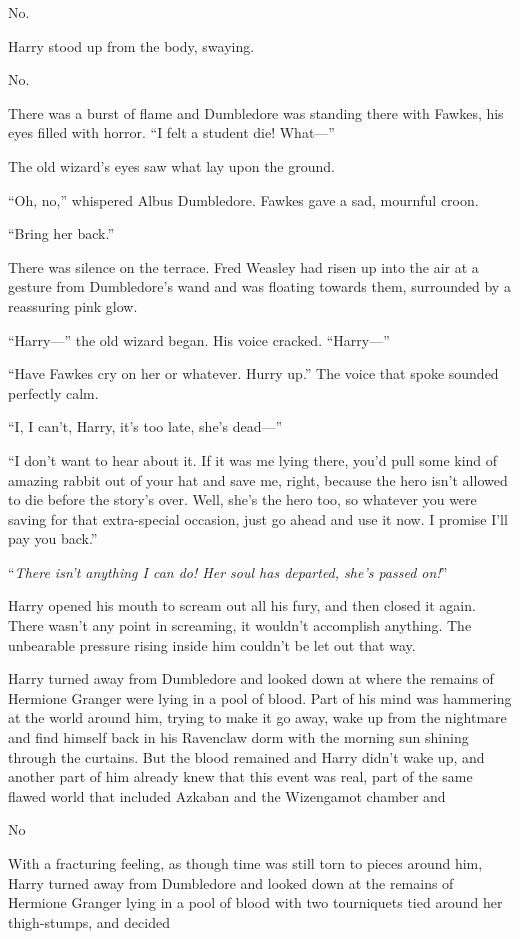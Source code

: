 No.

Harry stood up from the body, swaying.

No.

There was a burst of flame and Dumbledore was standing there with Fawkes, his eyes filled with horror. “I felt a student die! What—”

The old wizard’s eyes saw what lay upon the ground.

“Oh, no,” whispered Albus Dumbledore. Fawkes gave a sad, mournful croon.

“Bring her back.”

There was silence on the terrace. Fred Weasley had risen up into the air at a gesture from Dumbledore’s wand and was floating towards them, surrounded by a reassuring pink glow.

“Harry—” the old wizard began. His voice cracked. “Harry—”

“Have Fawkes cry on her or whatever. Hurry up.” The voice that spoke sounded perfectly calm.

“I, I can’t, Harry, it’s too late, she’s dead—”

“I don’t want to hear about it. If it was me lying there, you’d pull some kind of amazing rabbit out of your hat and save me, right, because the hero isn’t allowed to die before the story’s over. Well, she’s the hero too, so whatever you were saving for that extra-special occasion, just go ahead and use it now. I promise I’ll pay you back.”

“\emph{There isn’t anything I can do! Her soul has departed, she’s passed on!}”

Harry opened his mouth to scream out all his fury, and then closed it again. There wasn’t any point in screaming, it wouldn’t accomplish anything. The unbearable pressure rising inside him couldn’t be let out that way.

Harry turned away from Dumbledore and looked down at where the remains of Hermione Granger were lying in a pool of blood. Part of his mind was hammering at the world around him, trying to make it go away, wake up from the nightmare and find himself back in his Ravenclaw dorm with the morning sun shining through the curtains. But the blood remained and Harry didn’t wake up, and another part of him already knew that this event was real, part of the same flawed world that included Azkaban and the Wizengamot chamber and

No

With a fracturing feeling, as though time was still torn to pieces around him, Harry turned away from Dumbledore and looked down at the remains of Hermione Granger lying in a pool of blood with two tourniquets tied around her thigh-stumps, and decided

